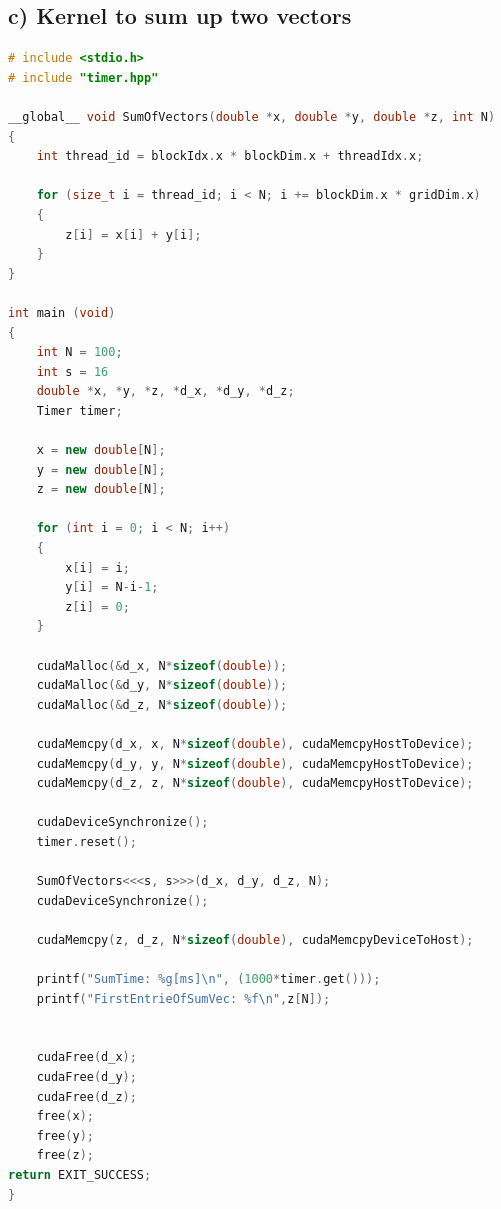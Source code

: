 \documentclass[11pt,a4paper]{article}
\begin{document}
\subsection*{c) Kernel to sum up two vectors}
\begin{lstlisting}[language=C++, caption={code for a)}]
# include <stdio.h>
# include "timer.hpp"

__global__ void SumOfVectors(double *x, double *y, double *z, int N)
{
	int thread_id = blockIdx.x * blockDim.x + threadIdx.x;

	for (size_t i = thread_id; i < N; i += blockDim.x * gridDim.x)
	{
		z[i] = x[i] + y[i];
	}
}

int main (void)
{
	int N = 100;
	int s = 16
	double *x, *y, *z, *d_x, *d_y, *d_z;
	Timer timer;

	x = new double[N];
	y = new double[N];
	z = new double[N];

	for (int i = 0; i < N; i++)
	{
		x[i] = i;
		y[i] = N-i-1;
		z[i] = 0;
	}

	cudaMalloc(&d_x, N*sizeof(double));
	cudaMalloc(&d_y, N*sizeof(double));
	cudaMalloc(&d_z, N*sizeof(double));

	cudaMemcpy(d_x, x, N*sizeof(double), cudaMemcpyHostToDevice);
	cudaMemcpy(d_y, y, N*sizeof(double), cudaMemcpyHostToDevice);
	cudaMemcpy(d_z, z, N*sizeof(double), cudaMemcpyHostToDevice);

	cudaDeviceSynchronize();
	timer.reset();

	SumOfVectors<<<s, s>>>(d_x, d_y, d_z, N);
	cudaDeviceSynchronize();

	cudaMemcpy(z, d_z, N*sizeof(double), cudaMemcpyDeviceToHost);

	printf("SumTime: %g[ms]\n", (1000*timer.get()));
	printf("FirstEntrieOfSumVec: %f\n",z[N]);


	cudaFree(d_x);
	cudaFree(d_y);
	cudaFree(d_z);
	free(x);
	free(y);
	free(z);
return EXIT_SUCCESS;
}
\end{lstlisting}
\end{document}
